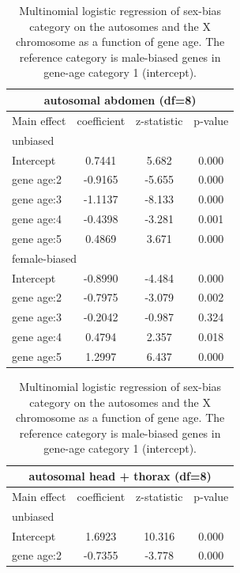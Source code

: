 \documentclass{article}
\begin{document}
\iffalse 
\begin{table}[H]
    \centering
    \caption{Multinomial logistic regression of sex-bias category on the autosomes and the X chromosome as a function of gene age. 
    The reference category is male-biased genes in gene-age category 1 (intercept).}
    \label{SItab:mLogReg}
    \begin{tabular}{l |c  |c| c}
        \multicolumn{4}{c}{autosomal abdomen (df=8)}\\
        \hline
        Main effect & coefficient & z-statistic & p-value \\
        \hline
        \hline
        \multicolumn{4}{l}{unbiased}\\
        \hline
        Intercept &0.7441 & 5.682& 0.000 \\
        \hline
        gene age:2 &   -0.9165 & -5.655 & 0.000 \\
        \hline
        gene age:3 &   -1.1137 & -8.133 & 0.000 \\
        \hline
        gene age:4 &   -0.4398 & -3.281 & 0.001 \\
        \hline
        gene age:5 &    0.4869 &  3.671 & 0.000 \\
        \hline
        \hline
        \multicolumn{4}{l}{female-biased}\\
        \hline
        Intercept & -0.8990   & -4.484 & 0.000 \\
        \hline
        gene age:2 &   -0.7975   & -3.079 & 0.002 \\
        \hline
        gene age:3 &   -0.2042   & -0.987 & 0.324 \\
        \hline
        gene age:4 &    0.4794   &  2.357 & 0.018 \\
        \hline
        gene age:5 &    1.2997   &  6.437& 0.000 \\
        \hline
    \end{tabular}
    \hspace{0.5cm}
    \begin{tabular}{l |c | c| c}
        \multicolumn{4}{c}{autosomal head + thorax (df=8)}\\
        \hline
        Main effect & coefficient & z-statistic & p-value \\
        \hline
        \hline
        \multicolumn{4}{l}{unbiased}\\
        \hline
        Intercept & 1.6923 & 10.316 & 0.000 \\
        \hline
        gene age:2 & -0.7355 & -3.778 & 0.000 \\

\end{tabular}
\end{table}
\end{document}
